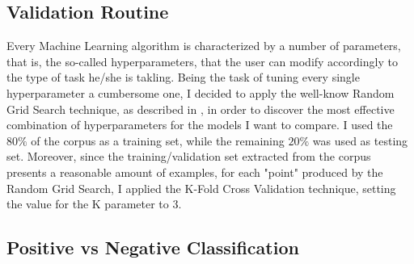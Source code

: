 \documentclass[11pt,twocolumn]{article}
\begin{document}
        \subsection{Validation Routine} %
        \label{sub:validation_routine}
            Every Machine Learning algorithm is characterized by a number of parameters, that is, the
            so-called hyperparameters, that the user can modify accordingly to the type of task he/she is
            takling. Being the task of tuning every single hyperparameter a cumbersome one, I decided to
            apply the well-know Random Grid Search technique, as described in \cite{random_grid_search}, in
            order to discover the most effective combination of hyperparameters for the models I want to
            compare. I used the $80\%$ of the corpus as a training set, while the remaining $20\%$ was used as
            testing set. Moreover, since the training/validation set extracted from the corpus
            presents a reasonable amount of examples, for each "point" produced by the Random Grid Search, I
            applied the K-Fold Cross Validation technique, setting the value for the K parameter to $3$.

        \subsection{Positive vs Negative Classification} %
        \label{sub:positive_vs_negative_classification}

\end{document}
